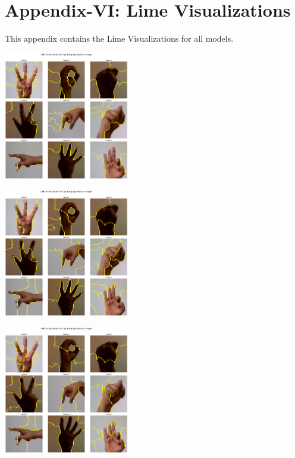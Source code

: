 \chapter*{Appendix-VI: Lime Visualizations}

\noindent This appendix contains the Lime Visualizations for all models.

\begin{multicols}{2}
\centering

\setcounter{figure}{0} %
\renewcommand{\thefigure}{2.\arabic{figure}} %

\includegraphics[width=0.41\textwidth]{Assets/lime_visualization/vgg19.png}

\vspace{0.5cm}

\includegraphics[width=0.41\textwidth]{Assets/lime_visualization/CONVNEXTBASE.png}

\vspace{0.5cm}

\includegraphics[width=0.41\textwidth]{Assets/lime_visualization/DenseNET121.png}


\end{multicols}
